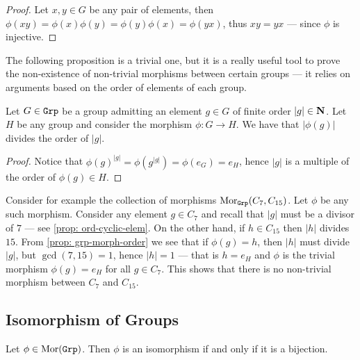 \begin{proof}
Let \(x, y \in G\) be any pair of elements, then \(\phi(x y) = \phi(x) \phi(y) =
\phi(y) \phi(x) = \phi(y x)\), thus \(x y = y x\) --- since \(\phi\) is
injective.
\end{proof}

The following proposition is a trivial one, but it is a really useful tool to
prove the non-existence of non-trivial morphisms between certain groups --- it
relies on arguments based on the order of elements of each group.

\begin{proposition}\label{prop: grp-morph-order}
Let \(G \in {\texttt{Grp}}\) be a group admitting an element \(g \in G\) of finite order
\(|g| \in \mathbf{N}\). Let \(H\) be any group and consider the morphism \(\phi: G \to
H\). We have that \(|\phi(g)|\) divides the order of \(|g|\).
\end{proposition}

\begin{proof}
Notice that \({\phi(g)}^{|g|} = \phi(g^{|g|}) = \phi(e_G) = e_H\), hence \(|g|\)
is a multiple of the order of \(\phi(g) \in H\).
\end{proof}

\begin{example}
Consider for example the collection of morphisms \(\operatorname{Mor}_{\texttt{Grp}}(C_7, C_{15})\).
Let \(\phi\) be any such morphism. Consider any element \(g \in C_7\) and
recall that \(|g|\) must be a divisor of \(7\) --- see \cref{prop:
ord-cyclic-elem}. On the other hand, if \(h \in C_{15}\) then \(|h|\) divides
\(15\). From \cref{prop: grp-morph-order} we see that if \(\phi(g) = h\), then
\(|h|\) must divide \(|g|\), but \(\gcd(7, 15) = 1\), hence
\(|h| = 1\) --- that is \(h = e_H\) and \(\phi\) is the trivial morphism
\(\phi(g) = e_H\) for all \(g \in C_7\). This shows that there is no
non-trivial morphism between \(C_7\) and \(C_{15}\).
\end{example}

\subsection{Isomorphism of Groups}

\begin{proposition}\label{prop: grp-iso-bij}
Let \(\phi \in \operatorname{Mor}({\texttt{Grp}})\). Then \(\phi\) is an isomorphism if and only if it
is a bijection.
\end{proposition}

